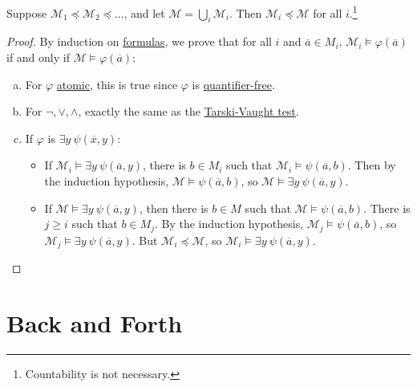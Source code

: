 \begin{proposition}
	Suppose \(\mathcal{M} _1 \preceq \mathcal{M} _2 \preceq \ldots \), and let \(\mathcal{M} = \bigcup_{i} \mathcal{M} _i\). Then \(\mathcal{M} _i \preceq \mathcal{M} \) for all \(i\).\footnote{Countability is not necessary.}
\end{proposition}
\begin{proof}
	By induction on \hyperref[def:formula]{formulas}, we prove that for all \(i\) and \(\overline{a} \in M_i\), \(\mathcal{M} _i \models \varphi (\overline{a} )\) if and only if \(\mathcal{M} \models \varphi (\overline{a} )\):
	\begin{enumerate}[(a)]
		\item For \(\varphi \) \hyperref[not:atomic-formula]{atomic}, this is true since \(\varphi \) is \hyperref[not:quantifier-free]{quantifier-free}.
		\item For \(\lnot, \lor, \land \), exactly the same as the \hyperref[prop:Tarski-Vaught-test]{Tarski-Vaught test}.
		\item If \(\varphi \) is \(\exists y\ \psi (\overline{x} , y)\):
		      \begin{itemize}
			      \item If \(\mathcal{M} _i \models \exists y\ \psi (\overline{a} , y)\), there is \(b\in M_i\) such that \(\mathcal{M} _i \models \psi (\overline{a} , b)\). Then by the induction hypothesis, \(\mathcal{M} \models \psi (\overline{a} , b)\), so \(\mathcal{M} \models \exists y\ \psi (\overline{a} , y)\).
			      \item If \(\mathcal{M} \models \exists y\ \psi (\overline{a} , y)\), then there is \(b\in M\) such that \(\mathcal{M} \models \psi (\overline{a} , b)\). There is \(j \geq i\) such that \(b\in M_j\). By the induction hypothesis, \(\mathcal{M} _j \models \psi (\overline{a} , b)\), so \(\mathcal{M} _j \models \exists y\ \psi (\overline{a} , y)\). But \(\mathcal{M} _i \preceq \mathcal{M} \), so \(\mathcal{M} _i \models \exists y\ \psi (\overline{a} , y)\).
		      \end{itemize}
	\end{enumerate}
\end{proof}

\section{Back and Forth}
